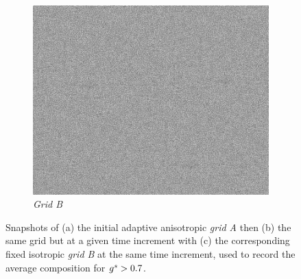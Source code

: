 \begin{figure}[htbp]
\begin{subfigure}[t]{0.3\textwidth}
    \label{fig:gridA}
  \end{subfigure}
  \begin{subfigure}[t]{0.3\textwidth}
    \centering
    \includegraphics[width=\textwidth]{Chapter5/Graphics/2d/GridB.png}
    \caption{\emph{Grid B}}
    \label{fig:gridB}
  \end{subfigure}
\caption{Snapshots of (a) the initial adaptive anisotropic \emph{grid A} then (b) the same grid but at 
a given time increment with (c) the corresponding fixed isotropic \emph{grid B} at the same time increment, 
used to record the average composition for ${g^s}>0.7$.}
\label{fig:smacs_grids}
\end{figure}

